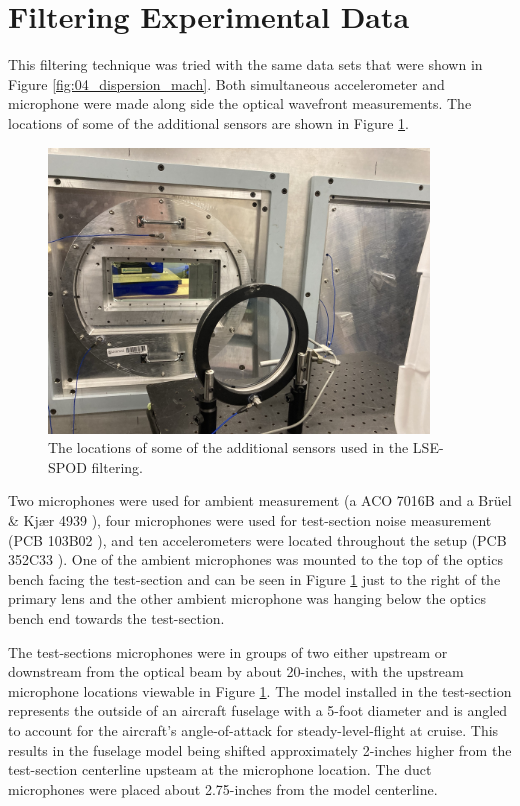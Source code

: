 \section{Filtering Experimental Data}
This filtering technique was tried with the same data sets that were shown in Figure \ref{fig:04_dispersion_mach}.
Both simultaneous accelerometer and microphone were made along side the optical wavefront measurements.
The locations of some of the additional sensors are shown in Figure \ref{fig:07_sensor placement}.
\begin{figure}
  \centering
  \includegraphics[trim={0 0 5in 3in},clip,width=0.9\textwidth]{../photos/IMG_9655.jpeg}
  \caption{The locations of some of the additional sensors used in the LSE-SPOD filtering.}
  \label{fig:07_sensor placement}
\end{figure}
Two microphones were used for ambient measurement (a ACO 7016B \cite{ACO-Microphones} and a Br\"uel \& Kj\ae r 4939 \cite{Bruel-Kjaer-4939}), four microphones were used for test-section noise measurement (PCB 103B02 \cite{PCB-103B02-C}), and ten accelerometers were located throughout the setup (PCB 352C33 \cite{PCB-352C33-H}).
One of the ambient microphones was mounted to the top of the optics bench facing the test-section and can be seen in Figure \ref{fig:07_sensor placement} just to the right of the primary lens and the other ambient microphone was hanging below the optics bench end towards the test-section.

The test-sections microphones were in groups of two either upstream or downstream from the optical beam by about 20-inches, with the upstream microphone locations viewable in Figure \ref{fig:07_sensor placement}.
The model installed in the test-section represents the outside of an aircraft fuselage with a 5-foot diameter and is angled to account for the aircraft's angle-of-attack for steady-level-flight at cruise.
This results in the fuselage model being shifted approximately 2-inches higher from the test-section centerline upsteam at the microphone location.
The duct microphones were placed about 2.75-inches from the model centerline.

